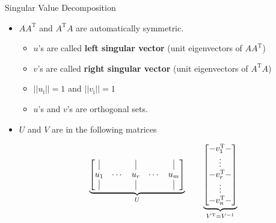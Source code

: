 \begin{frame}[t]{Singular Value Decomposition}
    \begin{itemize}
        \item $AA^{\text{T}}$ and $A^{\text{T}}A$ are automatically symmetric.
            \begin{itemize}
                \item $u$'s are called \textbf{left singular vector} (unit eigenvectors
                    of $AA^{\text{T}}$)     
                \item $v$'s are called \textbf{right singular vector} (unit eigenvectors
                    of $A^{\text{T}}A$)     
                \item $||u_{\text{i}}||=1$ and $||v_{\text{i}}||=1$  
                \item $u$'s and $v$'s are orthogonal sets.  
            \end{itemize}

        \item $U$ and $V$ are in the following matrices  
        
        \begin{equation*}
			\underbrace{
			\begin{bmatrix}
				\vline &   & \vline &  & \vline \\
				u_1 & \cdots & u_r & \cdots & u_m \\
				\vline &   & \vline &  & \vline \\
			\end{bmatrix}
        }_{U}
            \quad \quad
			\underbrace{
			\begin{bmatrix}
                -v_1^{\text{T}}-  \\
				\vdots \\
                -v_r^{\text{T}}-\\
				\vdots\\
                -v_n^{\text{T}}-\\
			\end{bmatrix}
        }_{V^{\text{T}} = V^{-1}}
        \end{equation*}
    \end{itemize}
\end{frame}

